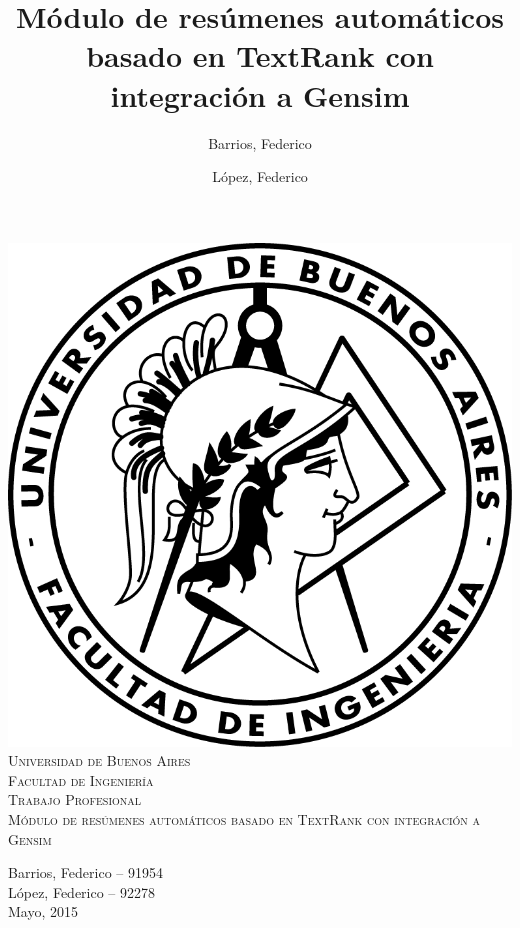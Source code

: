\documentclass[a4paper]{article}
\title{Módulo de resúmenes automáticos basado en TextRank con integración a Gensim}
\author{Barrios, Federico \and López, Federico}
\begin{document}
\thispagestyle{empty}
\begin{center}
\includegraphics{logo-fiuba.png}\\
\vspace{1cm}
\textsc{\LARGE Universidad de Buenos Aires}\\[0.3cm]
\textsc{\LARGE Facultad de Ingeniería}\\[1.2cm]
\textsc{\LARGE Trabajo Profesional}\\[1.2cm]
\textsc{\LARGE Módulo de resúmenes automáticos basado en TextRank con integración a Gensim}\\[0.3cm]
\end{center}

\vspace{20 mm}

\begin{flushright}
{\large
Barrios, Federico -- 91954\\
López, Federico -- 92278\\[0.1cm]
\vspace{2cm}
Mayo, 2015}
\end{flushright}

\pagestyle{fancy}
\newpage

\footnotesize


\newpage
\setcounter{page}{1}
\tableofcontents
\end{document}
